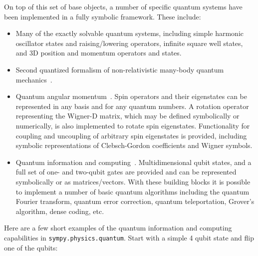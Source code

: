 On top of this set of base objects, a number of specific quantum systems have
been implemented in a fully symbolic framework. These include:

\begin{itemize}

\item Many of the exactly solvable quantum systems, including simple harmonic
oscillator states and raising/lowering operators, infinite square well states,
and 3D position and momentum operators and states.

\item Second quantized formalism of non-relativistic many-body quantum
mechanics~\cite{FetterWalecka2003}.

\item Quantum angular momentum~\cite{Zare1991}. Spin operators and their
eigenstates can be represented in any basis and for any quantum numbers.
A rotation operator representing the Wigner-D matrix, which may be defined
symbolically or numerically, is also implemented to rotate spin eigenstates.
Functionality for coupling and uncoupling of arbitrary spin eigenstates is
provided, including symbolic representations of Clebsch-Gordon coefficients and
Wigner symbols.

\item Quantum information and computing~\cite{Nielsen2011}. Multidimensional
qubit states, and a full set of one- and two-qubit gates are provided and can
be represented symbolically or as matrices/vectors. With these building blocks
it is possible to implement a number of basic quantum algorithms including the
quantum Fourier transform, quantum error correction, quantum teleportation,
Grover's algorithm, dense coding, etc.


\end{itemize}

Here are a few short examples of the quantum information and computing capabilities
in \verb|sympy.physics.quantum|. Start with a simple 4 qubit state and flip one of
the qubits:


